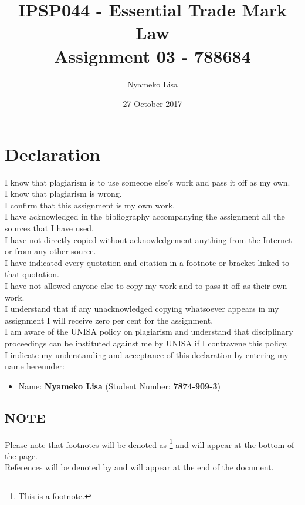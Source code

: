 \documentclass[11pt]{article}
\author{Nyameko Lisa}
\date{27 October 2017}
\title{IPSP044 - Essential Trade Mark Law\\\medskip
\large Assignment 03 - 788684}
\begin{document}
\maketitle
\addvspace{110pt}

\justifying
\addvspace{110pt}
\section*{Declaration}
\label{sec:org4ffabf4}
I know that plagiarism is to use someone else’s work and pass it off as my own.\\
I know that plagiarism is wrong.\\
I confirm that this assignment is my own work.\\
I have acknowledged in the bibliography accompanying the assignment all the sources that I have used.\\
I have not directly copied without acknowledgement anything from the Internet or from any other source.\\
I have indicated every quotation and citation in a footnote or bracket linked to that quotation.\\
I have not allowed anyone else to copy my work and to pass it off as their own work.\\
I understand that if any unacknowledged copying whatsoever appears in my assignment I will receive zero per cent for the assignment.\\
I am aware of the UNISA policy on plagiarism and understand that disciplinary proceedings can be instituted against me by UNISA if I contravene this policy.\\
I indicate my understanding and acceptance of this declaration by
entering my name hereunder:
\begin{itemize}
\item Name: \textbf{Nyameko Lisa} (Student Number: \textbf{7874-909-3})
\end{itemize}

\subsection*{NOTE}
\label{sec:org9feef80}
Please note that footnotes will be denoted as \footnote{This is a footnote.} and will
appear at the bottom of the page.\\
References will be denoted by \cite{rsa78_patents_act} and will appear at the end of the document.
\newpage
\end{document}

